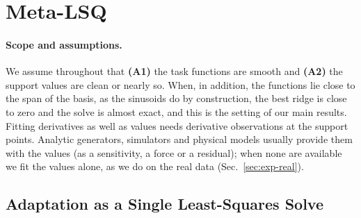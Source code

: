 \documentclass[fullpaper,final]{nldl}
\theoremstyle{plain}
\theoremstyle{definition}
\begin{document}
\section{Meta-LSQ}
\label{sec:method}

\paragraph{Scope and assumptions.}
We assume throughout that \textbf{(A1)} the task functions are smooth and
\textbf{(A2)} the support values are clean or nearly so. When, in addition, the
functions lie close to the span of the basis, as the sinusoids do by construction,
the best ridge is close to zero and the solve is almost exact, and this is the
setting of our main results. Fitting derivatives as well as values
needs derivative observations at the support points. Analytic generators,
simulators and physical models usually provide them with the values (as a
sensitivity, a force or a residual); when none are available we fit the values
alone, as we do on the real data (Sec.~\ref{sec:exp-real}).

\subsection{Adaptation as a Single Least-Squares Solve}
\label{sec:sobolev-solve}
\end{document}
